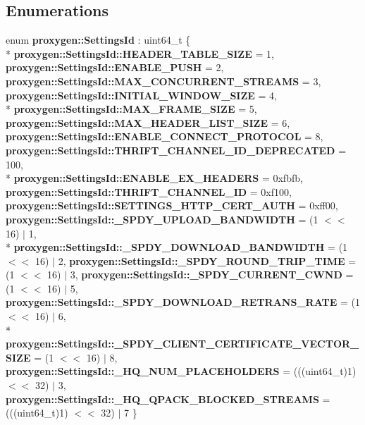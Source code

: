 \subsection*{Enumerations}
\begin{DoxyCompactItemize}
\item 
enum {\bf proxygen\+::\+Settings\+Id} \+: uint64\+\_\+t \{ \\*
{\bf proxygen\+::\+Settings\+Id\+::\+H\+E\+A\+D\+E\+R\+\_\+\+T\+A\+B\+L\+E\+\_\+\+S\+I\+ZE} = 1, 
{\bf proxygen\+::\+Settings\+Id\+::\+E\+N\+A\+B\+L\+E\+\_\+\+P\+U\+SH} = 2, 
{\bf proxygen\+::\+Settings\+Id\+::\+M\+A\+X\+\_\+\+C\+O\+N\+C\+U\+R\+R\+E\+N\+T\+\_\+\+S\+T\+R\+E\+A\+MS} = 3, 
{\bf proxygen\+::\+Settings\+Id\+::\+I\+N\+I\+T\+I\+A\+L\+\_\+\+W\+I\+N\+D\+O\+W\+\_\+\+S\+I\+ZE} = 4, 
\\*
{\bf proxygen\+::\+Settings\+Id\+::\+M\+A\+X\+\_\+\+F\+R\+A\+M\+E\+\_\+\+S\+I\+ZE} = 5, 
{\bf proxygen\+::\+Settings\+Id\+::\+M\+A\+X\+\_\+\+H\+E\+A\+D\+E\+R\+\_\+\+L\+I\+S\+T\+\_\+\+S\+I\+ZE} = 6, 
{\bf proxygen\+::\+Settings\+Id\+::\+E\+N\+A\+B\+L\+E\+\_\+\+C\+O\+N\+N\+E\+C\+T\+\_\+\+P\+R\+O\+T\+O\+C\+OL} = 8, 
{\bf proxygen\+::\+Settings\+Id\+::\+T\+H\+R\+I\+F\+T\+\_\+\+C\+H\+A\+N\+N\+E\+L\+\_\+\+I\+D\+\_\+\+D\+E\+P\+R\+E\+C\+A\+T\+ED} = 100, 
\\*
{\bf proxygen\+::\+Settings\+Id\+::\+E\+N\+A\+B\+L\+E\+\_\+\+E\+X\+\_\+\+H\+E\+A\+D\+E\+RS} = 0xfbfb, 
{\bf proxygen\+::\+Settings\+Id\+::\+T\+H\+R\+I\+F\+T\+\_\+\+C\+H\+A\+N\+N\+E\+L\+\_\+\+ID} = 0xf100, 
{\bf proxygen\+::\+Settings\+Id\+::\+S\+E\+T\+T\+I\+N\+G\+S\+\_\+\+H\+T\+T\+P\+\_\+\+C\+E\+R\+T\+\_\+\+A\+U\+TH} = 0xff00, 
{\bf proxygen\+::\+Settings\+Id\+::\+\_\+\+S\+P\+D\+Y\+\_\+\+U\+P\+L\+O\+A\+D\+\_\+\+B\+A\+N\+D\+W\+I\+D\+TH} = (1 $<$$<$ 16) $\vert$ 1, 
\\*
{\bf proxygen\+::\+Settings\+Id\+::\+\_\+\+S\+P\+D\+Y\+\_\+\+D\+O\+W\+N\+L\+O\+A\+D\+\_\+\+B\+A\+N\+D\+W\+I\+D\+TH} = (1 $<$$<$ 16) $\vert$ 2, 
{\bf proxygen\+::\+Settings\+Id\+::\+\_\+\+S\+P\+D\+Y\+\_\+\+R\+O\+U\+N\+D\+\_\+\+T\+R\+I\+P\+\_\+\+T\+I\+ME} = (1 $<$$<$ 16) $\vert$ 3, 
{\bf proxygen\+::\+Settings\+Id\+::\+\_\+\+S\+P\+D\+Y\+\_\+\+C\+U\+R\+R\+E\+N\+T\+\_\+\+C\+W\+ND} = (1 $<$$<$ 16) $\vert$ 5, 
{\bf proxygen\+::\+Settings\+Id\+::\+\_\+\+S\+P\+D\+Y\+\_\+\+D\+O\+W\+N\+L\+O\+A\+D\+\_\+\+R\+E\+T\+R\+A\+N\+S\+\_\+\+R\+A\+TE} = (1 $<$$<$ 16) $\vert$ 6, 
\\*
{\bf proxygen\+::\+Settings\+Id\+::\+\_\+\+S\+P\+D\+Y\+\_\+\+C\+L\+I\+E\+N\+T\+\_\+\+C\+E\+R\+T\+I\+F\+I\+C\+A\+T\+E\+\_\+\+V\+E\+C\+T\+O\+R\+\_\+\+S\+I\+ZE} = (1 $<$$<$ 16) $\vert$ 8, 
{\bf proxygen\+::\+Settings\+Id\+::\+\_\+\+H\+Q\+\_\+\+N\+U\+M\+\_\+\+P\+L\+A\+C\+E\+H\+O\+L\+D\+E\+RS} = (((uint64\+\_\+t)1) $<$$<$ 32) $\vert$ 3, 
{\bf proxygen\+::\+Settings\+Id\+::\+\_\+\+H\+Q\+\_\+\+Q\+P\+A\+C\+K\+\_\+\+B\+L\+O\+C\+K\+E\+D\+\_\+\+S\+T\+R\+E\+A\+MS} = (((uint64\+\_\+t)1) $<$$<$ 32) $\vert$ 7
 \}
\end{DoxyCompactItemize}



